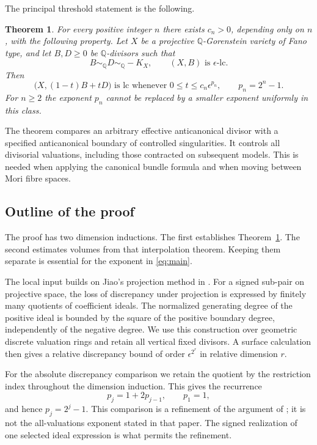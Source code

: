 \documentclass[11pt,reqno]{amsart}
\numberwithin{equation}{section}
\newtheorem{theorem}{Theorem}[section]
\theoremstyle{definition}
\theoremstyle{remark}
\newcommand{\Q}{\mathbb Q}
\newcommand{\simq}{\sim_{\Q}}
\newcommand{\eps}{\epsilon}
\begin{document}
The principal threshold statement is the following.
\begin{theorem}\label{thm:interp}
For every positive integer $n$ there exists $c_n>0$, depending only on $n$, with the following property. Let $X$ be a projective $\Q$-Gorenstein variety of Fano type, and let $B,D\ge0$ be $\Q$-divisors such that
\[
 B\simq D\simq-K_X,\qquad (X,B)\text{ is }\eps\text{-lc}.
\]
Then
\begin{equation}\label{eq:introinterp}
 \bigl(X,(1-t)B+tD\bigr)\text{ is lc whenever }
 0\le t\le c_n\eps^{p_n},\qquad p_n=2^n-1.
\end{equation}
For $n\ge2$ the exponent $p_n$ cannot be replaced by a smaller exponent uniformly in this class.
\end{theorem}

The theorem compares an arbitrary effective anticanonical divisor with a specified anticanonical boundary of controlled singularities. It controls all divisorial valuations, including those contracted on subsequent models. This is needed when applying the canonical bundle formula and when moving between Mori fibre spaces.

\subsection{Outline of the proof}
The proof has two dimension inductions. The first establishes Theorem~\ref{thm:interp}. The second estimates volumes from that interpolation theorem. Keeping them separate is essential for the exponent in \eqref{eq:main}.

The local input builds on Jiao's projection method in \cite{Jiao}. For a signed sub-pair on projective space, the loss of discrepancy under projection is expressed by finitely many quotients of coefficient ideals. The normalized generating degree of the positive ideal is bounded by the square of the positive boundary degree, independently of the negative degree. We use this construction over geometric discrete valuation rings and retain all vertical fixed divisors. A surface calculation then gives a relative discrepancy bound of order $\eps^{2^r}$ in relative dimension $r$.

For the absolute discrepancy comparison we retain the quotient by the restriction index throughout the dimension induction. This gives the recurrence
\[
 p_j=1+2p_{j-1},\qquad p_1=1,
\]
and hence $p_j=2^j-1$. This comparison is a refinement of the argument of \cite[Proposition~5.2]{Jiao}; it is not the all-valuations exponent stated in that paper. The signed realization of one selected ideal expression is what permits the refinement.
\end{document}
